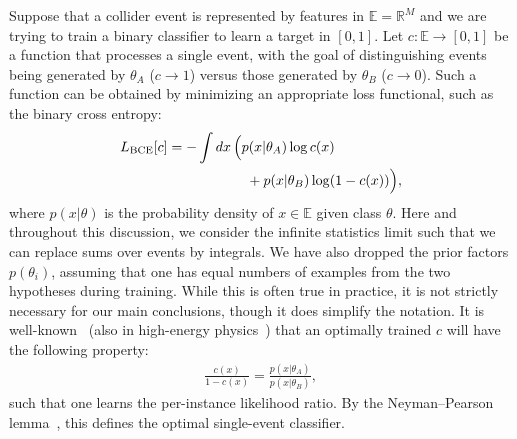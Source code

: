 \documentclass[aps,prx,reprint,preprintnumbers,superscriptaddress,nofootinbib,longbibliography,floatfix]{revtex4-2}
\newcommand{\thetaup}{\theta_A}
\newcommand{\thetadown}{\theta_B}
\begin{document}
Suppose that a collider event is represented by features in $\mathbb{E}=\mathbb{R}^M$ and we are trying to train a binary classifier to learn a target in $[0,1]$.
%
Let $c:\mathbb{E} \rightarrow [0,1]$ be a function that processes a single event, with the goal of distinguishing events being generated by $\thetaup$ ($c \to 1$) versus those generated by $\thetadown$ ($c \to 0$).
%
Such a function can be obtained by minimizing an appropriate loss functional, such as the binary cross entropy:
%
\begin{align}
\nonumber   L_{\rm BCE}[c]  =-\int dx\, \Big( & p(x|\thetaup) \log c(x) \\
&~ + p(x | \thetadown)  \log (1-c(x)) \Big),
\end{align}
%
where $p(x|\theta)$ is the probability density of $x\in\mathbb{E}$ given class $\theta$.
%
Here and throughout this discussion, we consider the infinite statistics limit such that we can replace sums over events by integrals.  
%
We have also dropped the prior factors $p(\theta_i)$, assuming that one has equal numbers of examples from the two hypotheses during training.
%
While this is often true in practice, it is not strictly necessary for our main conclusions, though it does simplify the notation.
%
It is well-known~\cite{hastie01statisticallearning,sugiyama_suzuki_kanamori_2012} (also in high-energy physics~\cite{2010.03569,1907.08209,Stoye:2018ovl,Hollingsworth:2020kjg,Brehmer:2018kdj,Brehmer:2018eca,Brehmer:2019xox,Brehmer:2018hga,Cranmer:2015bka,Badiali:2020wal,Andreassen:2020nkr,Andreassen:2019cjw,Fischer-ACAT2019}) that an optimally trained $c$ will have the following property:
%
\begin{align}
\label{eq:c_to_p}
    \frac{c(x)}{1-c(x)}=\frac{p(x|\thetaup)}{p(x|\thetadown)},
\end{align}
%
such that one learns the per-instance likelihood ratio.
%
By the Neyman–Pearson lemma~\cite{neyman1933ix}, this defines the optimal single-event classifier.
\end{document}
